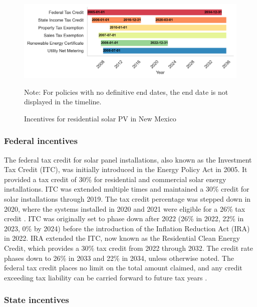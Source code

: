 \documentclass[12pt,twoside,letterpaper]{article}
\begin{document}
\begin{figure}[H]
    \centering
    \includegraphics[width=1\textwidth]{figures/policy_timeline.png}
    \caption{Incentives for residential solar PV in New Mexico}
    \label{fig:nm_incentive}
    \begin{flushleft}
        \footnotesize Note: For policies with no definitive end dates, the end date is not displayed in the timeline.
    \end{flushleft}
\end{figure}

\subsubsection{Federal incentives}


The federal tax credit for solar panel installations, also known as the Investment Tax Credit (ITC), was initially introduced in the Energy Policy Act in 2005. It provided a tax credit of 30\% for residential and commercial solar energy installations. ITC was extended multiple times and maintained a 30\% credit for solar installations through 2019. The tax credit percentage was stepped down in 2020, where the systems installed in 2020 and 2021 were eligible for a 26\% tax credit \parencite{doeitc}. ITC was originally set to phase down after 2022 (26\% in 2022, 22\% in 2023, 0\% by 2024) before the introduction of the Inflation Reduction Act (IRA) in 2022. IRA extended the ITC, now known as the Residential Clean Energy Credit, which provides a 30\% tax credit from 2022 through 2032. The credit rate phases down to 26\% in 2033 and 22\% in 2034, unless otherwise noted. The federal tax credit places no limit on the total amount claimed, and any credit exceeding tax liability can be carried forward to future tax years \parencite{irs}.

\subsubsection{State incentives}
\end{document}
